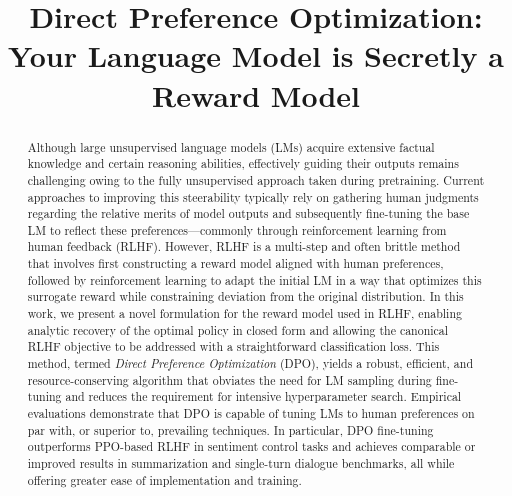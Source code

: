 \title{Direct Preference Optimization: Your Language Model is Secretly a Reward Model}

\begin{abstract}
Although large unsupervised language models (LMs) acquire extensive factual knowledge and certain reasoning abilities, effectively guiding their outputs remains challenging owing to the fully unsupervised approach taken during pretraining. Current approaches to improving this steerability typically rely on gathering human judgments regarding the relative merits of model outputs and subsequently fine-tuning the base LM to reflect these preferences—commonly through reinforcement learning from human feedback (RLHF). However, RLHF is a multi-step and often brittle method that involves first constructing a reward model aligned with human preferences, followed by reinforcement learning to adapt the initial LM in a way that optimizes this surrogate reward while constraining deviation from the original distribution. In this work, we present a novel formulation for the reward model used in RLHF, enabling analytic recovery of the optimal policy in closed form and allowing the canonical RLHF objective to be addressed with a straightforward classification loss. This method, termed \textit{Direct Preference Optimization} (DPO), yields a robust, efficient, and resource-conserving algorithm that obviates the need for LM sampling during fine-tuning and reduces the requirement for intensive hyperparameter search. Empirical evaluations demonstrate that DPO is capable of tuning LMs to human preferences on par with, or superior to, prevailing techniques. In particular, DPO fine-tuning outperforms PPO-based RLHF in sentiment control tasks and achieves comparable or improved results in summarization and single-turn dialogue benchmarks, all while offering greater ease of implementation and training.
\end{abstract}

